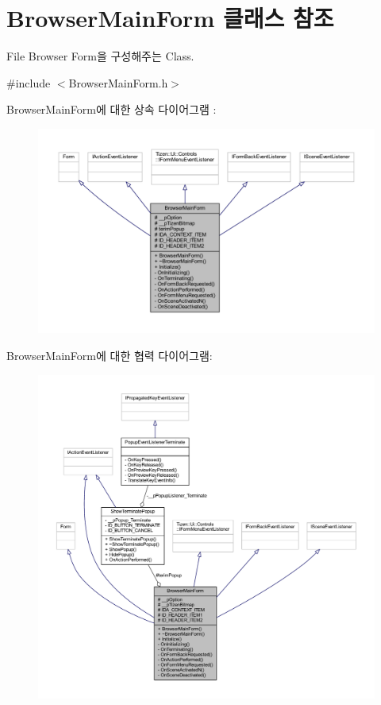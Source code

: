 \hypertarget{class_browser_main_form}{\section{Browser\+Main\+Form 클래스 참조}
\label{class_browser_main_form}
}


File Browser Form을 구성해주는 Class.  




{\ttfamily \#include $<$Browser\+Main\+Form.\+h$>$}



Browser\+Main\+Form에 대한 상속 다이어그램 \+: 
\nopagebreak
\begin{figure}[H]
\begin{center}
\leavevmode
\includegraphics[width=350pt]{class_browser_main_form__inherit__graph}
\end{center}
\end{figure}


Browser\+Main\+Form에 대한 협력 다이어그램\+:
\nopagebreak
\begin{figure}[H]
\begin{center}
\leavevmode
\includegraphics[width=350pt]{class_browser_main_form__coll__graph}
\end{center}
\end{figure}
